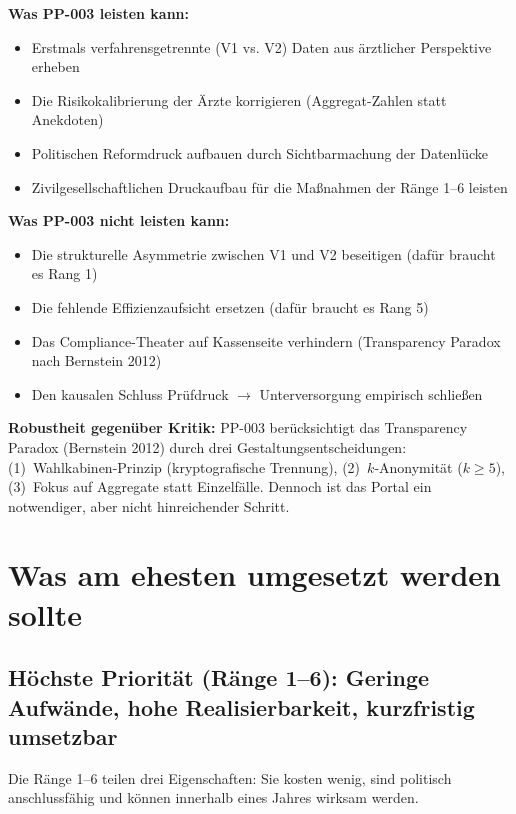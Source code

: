 \documentclass{umbruch-position}
\begin{document}
\textbf{Was PP-003 leisten kann:}
\begin{itemize}
  \item Erstmals verfahrensgetrennte (V1 vs. V2) Daten aus \"arztlicher Perspektive erheben
  \item Die Risikokalibrierung der \"Arzte korrigieren (Aggregat-Zahlen statt Anekdoten)
  \item Politischen Reformdruck aufbauen durch Sichtbarmachung der Datenl\"ucke
  \item Zivilgesellschaftlichen Druckaufbau f\"ur die Ma\ss{}nahmen der R\"ange 1--6 leisten
\end{itemize}

\textbf{Was PP-003 nicht leisten kann:}
\begin{itemize}
  \item Die strukturelle Asymmetrie zwischen V1 und V2 beseitigen (daf\"ur braucht es Rang 1)
  \item Die fehlende Effizienzaufsicht ersetzen (daf\"ur braucht es Rang 5)
  \item Das Compliance-Theater auf Kassenseite verhindern (Transparency Paradox nach Bernstein 2012)
  \item Den kausalen Schluss Pr\"ufdruck $\to$ Unterversorgung empirisch schlie\ss{}en
\end{itemize}

\textbf{Robustheit gegen\"uber Kritik:} PP-003 ber\"ucksichtigt das Transparency Paradox (Bernstein 2012) durch drei Gestaltungsentscheidungen: (1)~Wahlkabinen-Prinzip (kryptografische Trennung), (2)~$k$-Anonymit\"at ($k\geq5$), (3)~Fokus auf Aggregate statt Einzelf\"alle. Dennoch ist das Portal ein notwendiger, aber nicht hinreichender Schritt.

\section{Was am ehesten umgesetzt werden sollte}

\subsection*{H\"ochste Priorit\"at (R\"ange 1--6): Geringe Aufw\"ande, hohe Realisierbarkeit, kurzfristig umsetzbar}

Die R\"ange 1--6 teilen drei Eigenschaften: Sie kosten wenig, sind politisch anschlussf\"ahig und k\"onnen innerhalb eines Jahres wirksam werden.
\end{document}
